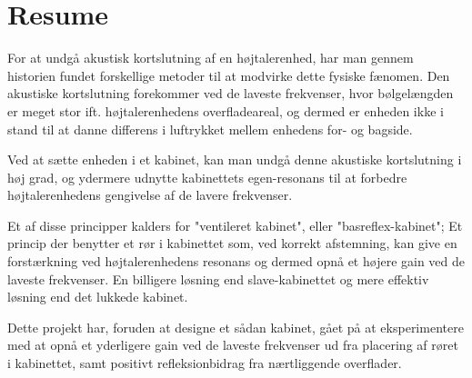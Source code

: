 \chapter*{Resume}

For at undgå akustisk kortslutning af en højtalerenhed, har man gennem historien fundet forskellige metoder til at modvirke dette fysiske fænomen. 
Den akustiske kortslutning forekommer ved de laveste frekvenser, hvor bølgelængden er meget stor ift. højtalerenhedens overfladeareal, og dermed er enheden ikke i stand til at danne differens i luftrykket mellem enhedens for- og bagside.

Ved at sætte enheden i et kabinet, kan man undgå denne akustiske kortslutning i høj grad, og ydermere udnytte kabinettets egen-resonans til at forbedre højtalerenhedens gengivelse af de lavere frekvenser. 

Et af disse principper kalders for "ventileret kabinet", eller "basreflex-kabinet"; Et princip der benytter et rør i kabinettet som, ved korrekt afstemning, kan give en forstærkning ved højtalerenhedens resonans og dermed opnå et højere gain ved de laveste frekvenser. En billigere løsning end slave-kabinettet og mere effektiv løsning end det lukkede kabinet. 

Dette projekt har, foruden at designe et sådan kabinet, gået på at eksperimentere med at opnå et yderligere gain ved de laveste frekvenser ud fra placering af røret i kabinettet, samt positivt refleksionbidrag fra nærtliggende overflader. 


